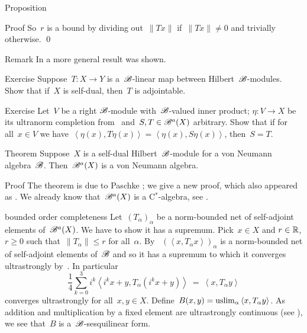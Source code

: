 \documentclass[b]{subfiles}
\begin{document}
\begin{parsec}
\begin{point}{Proposition}
\begin{point}{Proof}
So~$r$ is a bound
    by dividing out~$\| T x \|$
    if~$\| Tx \| \neq 0$
    and trivially otherwise.  \qed
\end{point}
\begin{point}{Remark}%
In  a more general result was shown.
\end{point}
\end{point}
\begin{point}{Exercise}%
Suppose~$T\colon X \to Y$ is a~$\mathscr{B}$-linear map between
    Hilbert~$\mathscr{B}$-modules.
Show that if~$X$ is self-dual,
    then~$T$ is adjointable.
\end{point}
\begin{point}{Exercise}%
Let~$V$ be a right $\mathscr{B}$-module with~$\mathscr{B}$-valued inner product;
    $\eta\colon V \to X$ be its ultranorm completion
    from~ and~$S,T \in \mathscr{B}^a(X)$ arbitrary.
Show that if for all~$x\in V$ we
have~$\left<\eta(x), T\eta(x)\right> = \left<\eta(x), S\eta(x)\right>$,
    then~$S=T$.
\end{point}
\begin{point}{Theorem}%
Suppose~$X$ is a self-dual Hilbert~$\mathscr{B}$-module
    for a von Neumann algebra~$\mathscr{B}$.
Then~$\mathscr{B}^a(X)$ is a von Neumann algebra.
\begin{point}{Proof}%
The theorem is due to Paschke \cite[Prop.~3.10]{paschke};
    we give a new proof, which also appeared as .
We already know that~$\mathscr{B}^a(X)$ is a C$^*$-algebra, see .
\begin{point}{bounded order completeness}%
Let~$(T_\alpha)_\alpha$ be a norm-bounded net of self-adjoint elements
    of~$\mathscr{B}^a(X)$.  We have to show it has a supremum.
Pick~$x\in X$ and  $r\in \mathbb{R}$, $r\geq0 $
such that~$\|T_\alpha\| \leq r$ for all~$\alpha$.
By ~$(\left<x,T_\alpha x\right>)_\alpha$
    is a norm-bounded net of self-adjoint elements of~$\mathscr{B}$
    and so it has a supremum to which
    it converges ultrastrongly by~.
In particular
\begin{equation*}
\frac{1}{4} \sum^3_{k=0} i^k \left< i^kx+y, T_\alpha(i^k x+y)\right>
    \ =\  \left<x, T_\alpha y\right>
\end{equation*}
converges ultrastrongly for all~$x,y \in X$.
Define~$B(x,y) = \uslim_\alpha \left<x,T_\alpha y\right>$.
As addition and multiplication by a fixed element are
    ultrastrongly continuous (see ),
    we see that~$B$ is a~$\mathscr{B}$-sesquilinear form.

\end{point}
\end{point}
\end{point}
\end{parsec}
\end{document}
